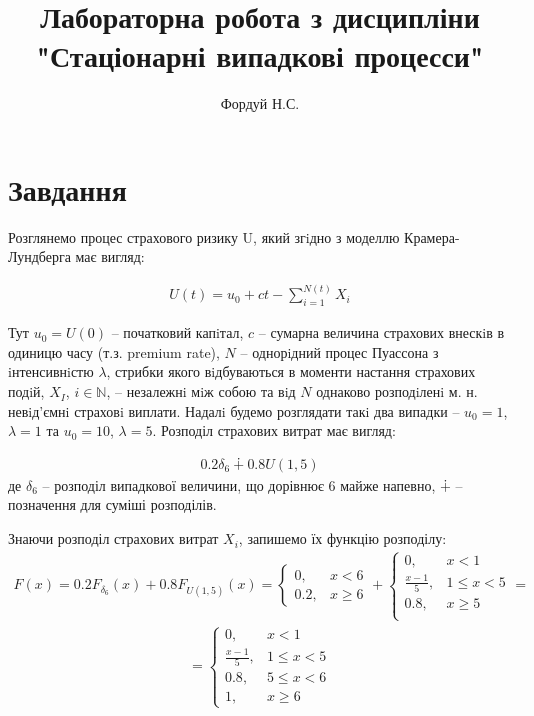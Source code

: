 \documentclass{article}
\author{Фордуй Н.С.}
\title{Лабораторна робота з дисципліни "Стаціонарні випадкові процесси"}
\newcommand{\suml}{\sum\limits}
\begin{document}
    \maketitle
    \tableofcontents
    \section{Завдання}
    Розглянемо процес страхового ризику U, який згiдно з моделлю Крамера-Лундберга має вигляд:

    \begin{gather}
        U(t) = u_0 + ct - \suml_{i=1}^{N(t)}X_i
    \end{gather}

    Тут $u_0 = U(0)$ -- початковий капiтал, $c$ -- сумарна величина страхових внескiв 
    в одиницю часу (т.з. premium rate),
    $N$ -- однорiдний процес Пуассона з iнтенсивнiстю $\lambda$, 
    стрибки якого вiдбуваються в моменти настання страхових подiй,
    $X_I$, $i \in \mathbb{N}$, -- незалежнi мiж собою та вiд $N$ 
    однаково розподiленi м. н. невiд’ємнi страховi 
    виплати. Надалi будемо розглядати такi два випадки --
    $u_0 = 1$, $\lambda = 1$ та $u_0 = 10$, $\lambda = 5$. Розподіл страхових витрат має вигляд:

    \begin{gather}
        0.2\delta_6 \dotplus 0.8 U(1, 5)
    \end{gather}
    де $\delta_6$ -- розподіл випадкової величини, що дорівнює $6$ майже напевно, 
    $\dotplus$ -- позначення для суміші розподілів.

    Знаючи розподіл страхових витрат $X_i$, запишемо їх функцію розподілу:
    \begin{gather}
        F(x) = 0.2F_{\delta_6}(x) + 0.8F_{U(1, 5)}(x) = \begin{cases}
            0, & x < 6 \\
            0.2, & x \geq 6
        \end{cases}
        +
        \begin{cases}
            0, & x < 1 \\
            \frac{x-1}{5}, & 1 \leq x < 5 \\
            0.8, & x \geq 5 \\
        \end{cases} = 
    \end{gather}
    \begin{gather*}
        = \begin{cases}
            0, & x < 1\\
            \frac{x-1}{5}, & 1 \leq x < 5 \\
            0.8, & 5 \leq x < 6 \\
            1, & x \geq 6 
        \end{cases}
    \end{gather*}
\end{document}
